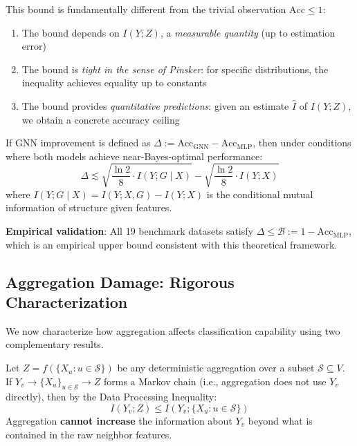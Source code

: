 \begin{remark}
\label{rem:nontrivial_budget}
This bound is fundamentally different from the trivial observation $\mathrm{Acc} \leq 1$:
\begin{enumerate}
    \item The bound depends on $I(Y; Z)$, a \textit{measurable quantity} (up to estimation error)
    \item The bound is \textit{tight in the sense of Pinsker}: for specific distributions, the inequality achieves equality up to constants
    \item The bound provides \textit{quantitative predictions}: given an estimate $\hat{I}$ of $I(Y; Z)$, we obtain a concrete accuracy ceiling
\end{enumerate}
\end{remark}

\begin{corollary}
\label{cor:budget_principle}
If GNN improvement is defined as $\Delta := \mathrm{Acc}_{\text{GNN}} - \mathrm{Acc}_{\text{MLP}}$, then under conditions where both models achieve near-Bayes-optimal performance:
\begin{equation}
    \Delta \lesssim \sqrt{\frac{\ln 2}{8} \cdot I(Y; G \mid X)} - \sqrt{\frac{\ln 2}{8} \cdot I(Y; X)}
\end{equation}
where $I(Y; G \mid X) = I(Y; X, G) - I(Y; X)$ is the conditional mutual information of structure given features.

\textbf{Empirical validation}: All 19 benchmark datasets satisfy $\Delta \leq \mathcal{B} := 1 - \mathrm{Acc}_{\text{MLP}}$, which is an empirical upper bound consistent with this theoretical framework.
\end{corollary}

\subsection{Aggregation Damage: Rigorous Characterization}
\label{subsec:adr_rigorous}

We now characterize how aggregation affects classification capability using two complementary results.

\begin{theorem}
\label{thm:dpi_aggregation}
Let $Z = f(\{X_u : u \in \mathcal{S}\})$ be any deterministic aggregation over a subset $\mathcal{S} \subseteq V$. If $Y_v \to \{X_u\}_{u \in \mathcal{S}} \to Z$ forms a Markov chain (i.e., aggregation does not use $Y_v$ directly), then by the Data Processing Inequality:
\begin{equation}
    I(Y_v; Z) \leq I(Y_v; \{X_u : u \in \mathcal{S}\})
\end{equation}
Aggregation \textbf{cannot increase} the information about $Y_v$ beyond what is contained in the raw neighbor features.
\end{theorem}

